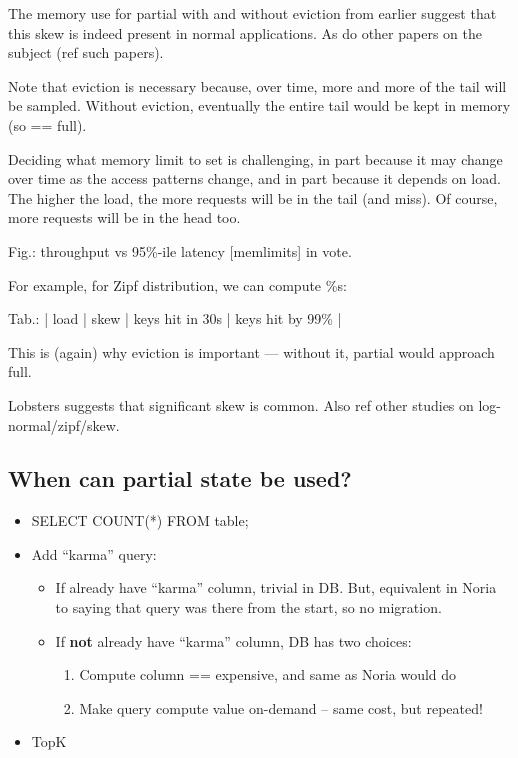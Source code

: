 \begin{inprogress}
The memory use for partial with and without eviction from earlier suggest that
this skew is indeed present in normal applications. As do other papers on the
subject (ref such papers).
\end{inprogress}

\begin{inprogress}
Note that eviction is necessary because, over time, more and more of the
tail will be sampled. Without eviction, eventually the entire tail would
be kept in memory (so == full).
\end{inprogress}

Deciding what memory limit to set is challenging, in part because it
may change over time as the access patterns change, and in part because
it depends on load. The higher the load, the more requests will be in
the tail (and miss). Of course, more requests will be in the head too.

Fig.: throughput vs 95\%-ile latency [memlimits] in vote.

For example, for Zipf distribution, we can compute \%s:

Tab.: | load | skew | keys hit in 30s | keys hit by 99\% | 

This is (again) why eviction is important — without it, partial would approach
full.

Lobsters suggests that significant skew is common. Also ref other
studies on log-normal/zipf/skew.

\subsection{When can partial state be used?}

\begin{itemize}
 \item SELECT COUNT(*) FROM table;
 \item Add ``karma'' query:
   \begin{itemize}
    \item If already have ``karma'' column, trivial in DB. But, equivalent in
      Noria to saying that query was there from the start, so no migration.
    \item If \textbf{not} already have ``karma'' column, DB has two choices:
     \begin{enumerate}
      \item Compute column == expensive, and same as Noria would do
      \item Make query compute value on-demand -- same cost, but repeated!
     \end{enumerate}
   \end{itemize}
 \item TopK
\end{itemize}

